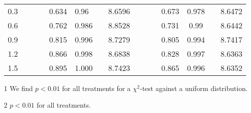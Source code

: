\documentclass[12pt]{article}
\begin{document}
\begin{table}[!ht]
\begin{threeparttable}
\begin{tabular}{clllcllclllcclc}
0.3                                               &  &                               &  & 0.634                        & 0.96                                            &  & 8.6596                                                                    &  &                               &  & 0.673                                  & 0.978                                 &  & 8.6472                                                                    \\
0.6                                               &  &                               &  & 0.762                        & 0.986                                           &  & 8.8528                                                                    &  &                               &  & 0.731                                  & 0.99                                  &  & 8.6442                                                                    \\
0.9                                               &  &                               &  & 0.815                        & 0.996                                           &  & 8.7279                                                                    &  &                               &  & 0.805                                  & 0.994                                 &  & 8.7417                                                                    \\
1.2                                               &  &                               &  & 0.866                        & 0.998                                           &  & 8.6838                                                                    &  &                               &  & 0.828                                  & 0.997                                 &  & 8.6363                                                                    \\
1.5                                               &  &                               &  & 0.895                        & 1.000                                             &  & 8.7423                                                                    &  &                               &  & 0.865                                  & 0.996                                 &  & 8.6352                                                                    \\ \bottomrule
\end{tabular}
\begin{tablenotes}
\item[1] We find \(p<0.01\) for all treatments for a \(\chi^2\)-test against a uniform distribution.
\item[2] \(p<0.01\) for all treatments.
\end{tablenotes}
\end{threeparttable}
\label{tab:1}
\end{table}
\end{document}
